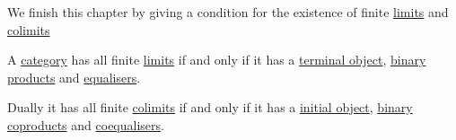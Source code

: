 \documentclass[../../main]{subfiles}
\begin{document}
We finish this chapter by giving a condition for the existence of finite \hyperref[def:categorical-limit]{limits} and \hyperref[def:categorical-colimit]{colimits}
\begin{theorem}\label{thm:existence-finite-limits-colimits}
  A \hyperref[def:category]{category} has all finite \hyperref[def:categorical-limit]{limits} if and only if it has a \hyperref[def:initial-terminal-object]{terminal object}, \hyperref[def:categorical-product]{binary products} and \hyperref[def:equaliser]{equalisers}.

  Dually it has all finite \hyperref[def:categorical-colimit]{colimits} if and only if it has a \hyperref[def:initial-terminal-object]{initial object}, \hyperref[def:categorical-coproduct]{binary coproducts} and \hyperref[def:coequaliser]{coequalisers}.
\end{theorem}
\end{document}
